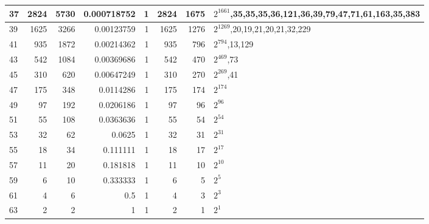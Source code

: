 \documentclass[10pt,a4paper]{standalone}
\begin{document}
\begin{tabular}{l|r|r|r|r|r|r|l|}
37 & 2824 & 5730 & 0.000718752 & 1 & 2824 & 1675 & $2^{1661}$,35,35,35,36,121,36,39,79,47,71,61,163,35,383 \\ \hline
39 & 1625 & 3266 & 0.00123759 & 1 & 1625 & 1276 & $2^{1269}$,20,19,21,20,21,32,229 \\ \hline
41 & 935 & 1872 & 0.00214362 & 1 & 935 & 796 & $2^{794}$,13,129 \\ \hline
43 & 542 & 1084 & 0.00369686 & 1 & 542 & 470 & $2^{469}$,73 \\ \hline
45 & 310 & 620 & 0.00647249 & 1 & 310 & 270 & $2^{269}$,41 \\ \hline
47 & 175 & 348 & 0.0114286 & 1 & 175 & 174 & $2^{174}$ \\ \hline
49 & 97 & 192 & 0.0206186 & 1 & 97 & 96 & $2^{96}$ \\ \hline
51 & 55 & 108 & 0.0363636 & 1 & 55 & 54 & $2^{54}$ \\ \hline
53 & 32 & 62 & 0.0625 & 1 & 32 & 31 & $2^{31}$ \\ \hline
55 & 18 & 34 & 0.111111 & 1 & 18 & 17 & $2^{17}$ \\ \hline
57 & 11 & 20 & 0.181818 & 1 & 11 & 10 & $2^{10}$ \\ \hline
59 & 6 & 10 & 0.333333 & 1 & 6 & 5 & $2^{5}$ \\ \hline
61 & 4 & 6 & 0.5 & 1 & 4 & 3 & $2^{3}$ \\ \hline
63 & 2 & 2 & 1 & 1 & 2 & 1 & $2^{1}$ \\ \hline
\end{tabular}
\end{document}
